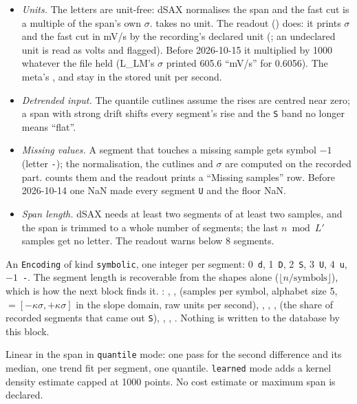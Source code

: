 \begin{itemize}
\item \emph{Units.} The letters are unit-free: dSAX normalises the span and the fast cut is a
  multiple of the span's own $\sigma$.  takes no unit. The readout
  () does: it prints $\sigma$ and the fast cut in mV/s by the recording's
  declared unit (; an undeclared unit is read as volts and flagged). Before
  2026-10-15 it multiplied by 1000 whatever the file held (L\_LM's $\sigma$ printed 605.6
  ``mV/s'' for 0.6056). The meta's ,  and
   stay in the stored unit per second.
\item \emph{Detrended input.} The quantile cutlines assume the rises are centred near zero; a
  span with strong drift shifts every segment's rise and the \texttt{S} band no longer means
  ``flat''.
\item \emph{Missing values.} A segment that touches a missing sample gets symbol $-1$
  (letter \texttt{-}); the normalisation, the cutlines and $\sigma$ are computed on the
  recorded part.  counts them and the readout prints a
  ``Missing samples'' row. Before 2026-10-14 one NaN made every segment \texttt{U} and the floor
  NaN.
\item \emph{Span length.} dSAX needs at least two segments of at least two samples, and the span
  is trimmed to a whole number of segments; the last $n \bmod L'$ samples get no letter. The
  readout warns below 8 segments.
\end{itemize}

An \texttt{Encoding} of kind \texttt{symbolic}, one integer per segment: 0~\texttt{d},
1~\texttt{D}, 2~\texttt{S}, 3~\texttt{U}, 4~\texttt{u}, $-1$~\texttt{-}. The segment length is
recoverable from the shapes alone ($\lfloor n/\text{symbols}\rfloor$), which is how the next block
finds it. : , ,  (samples per symbol,
alphabet size 5,  $= [-\kappa\sigma, +\kappa\sigma]$ in the slope domain, raw
units per second), , , ,
 (the share of recorded segments that came out \texttt{S}),
, , . Nothing is written to the
database by this block.

Linear in the span in \texttt{quantile} mode: one pass for the second difference and its
median, one trend fit per segment, one quantile. \texttt{learned} mode adds a kernel density
estimate capped at 1000 points. No cost estimate or maximum span is declared.

